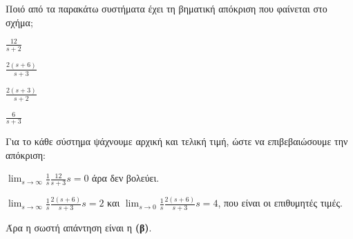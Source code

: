\documentclass[11pt,a4paper,notitlepage,fleqn]{article}
\begin{document}
\begin{exercise}
Ποιό από τα παρακάτω συστήματα έχει τη βηματική απόκριση που φαίνεται στο σχήμα;


\begin{enumlatin}
	\item \( \displaystyle \frac{12}{s+2} \)
	\item \( \displaystyle \frac{2(s+6)}{s+3} \)
	\item \( \displaystyle \frac{2(s+3)}{s+2} \)
	\item \( \displaystyle \frac{6}{s+3} \)
\end{enumlatin}

\tcblower

Για το κάθε σύστημα ψάχνουμε αρχική και τελική τιμή, ώστε να επιβεβαιώσουμε την απόκριση:
\begin{enumlatin}
	\item \( \displaystyle \lim_{s\to \infty}
	\frac{1}{s} \frac{12}{s+3} s = 0
	 \) άρα δεν βολεύει.
	\item \( \displaystyle \lim_{s\to \infty} \frac{1}{s}\frac{2(s+6)}{s+3}s=2 \)
	και \( \displaystyle \lim_{s\to 0} \frac{1}{s}\frac{2(s+6)}{s+3}s=4  \), που είναι οι
	επιθυμητές τιμές.
\end{enumlatin}

Άρα η σωστή απάντηση είναι η \textbf{(β)}.

\end{exercise}
\end{document}
